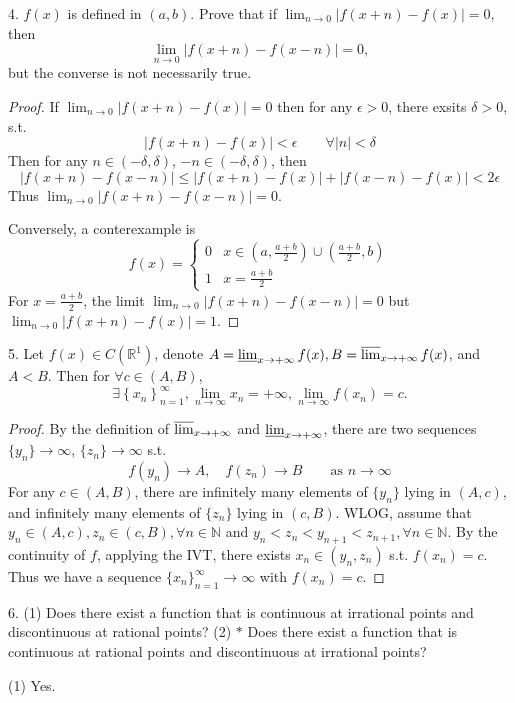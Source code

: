 \begin{exercise}
4. $f(x)$ is defined in $(a, b)$. Prove that if $\lim_{n \rightarrow 0}|f(x+n)-f(x)|=0$, then
\[
\lim_{n \rightarrow 0}|f(x+n)-f(x-n)|=0,
\]but the converse is not necessarily true.
\end{exercise}
\begin{proof}
If $\lim_{ n \to 0 }\lvert f(x+n)-f(x) \rvert=0$ then for any $\epsilon>0$, there exsits $\delta>0$, s.t.
\[
\lvert f(x+n)-f(x) \rvert <\epsilon \qquad \forall \lvert n \rvert <\delta
\]
Then for any $n\in(-\delta,\delta)$, $-n\in(-\delta,\delta)$, then
\[
\lvert f(x+n)-f(x-n) \rvert \leq \lvert f(x+n)-f(x) \rvert +\lvert f(x-n)-f(x) \rvert <2\epsilon
\]
Thus $\lim_{ n \to 0 }\lvert f(x+n)-f(x-n) \rvert=0$.

Conversely, a conterexample is
\[
f(x)=\begin{cases}
0 & x\in\left( a,\frac{a+b}{2} \right)\cup\left( \frac{a+b}{2},b \right) \\
1 & x=\frac{a+b}{2}
\end{cases}
\]
For $x=\frac{a+b}{2}$, the limit $\lim_{ n \to 0 }\lvert f(x+n)-f(x-n) \rvert=0$ but $\lim_{ n \to 0 }\lvert f(x+n)-f(x) \rvert=1$.
\end{proof}

\begin{exercise}
5. Let $f(x) \in C\left(\mathbb{R}^1\right)$, denote $A=\varliminf_{x \rightarrow+\infty} f(x), B=\varlimsup_{x \rightarrow+\infty} f(x)$, and $A<B$. Then for $\forall c \in(A, B)$,
\[
\exists\left\{x_n\right\}_{n=1}^{\infty}, \lim _{n \rightarrow \infty} x_n=+\infty, \lim _{n \rightarrow \infty} f\left(x_n\right)=c .
\]
\end{exercise}
\begin{proof}
By the definition of $\varlimsup_{ x \to +\infty }$ and $\varliminf_{ x \to +\infty }$, there are two sequences $\{ y_n \}\to \infty$, $\{ z_n \}\to \infty$ s.t.
\[
f(y_n)\to A,\quad f(z_n)\to B\qquad \text{as }n\to \infty
\]
For any $c\in(A,B)$, there are infinitely many elements of $\{ y_n \}$ lying in $(A,c)$, and infinitely many elements of $\{ z_n \}$ lying in $(c,B)$. WLOG, assume that $y_n\in (A, c), z_n\in (c, B),\forall n\in \mathbb{N}$ and $y_n<z_n<y_{n+1}<z_{n+1},\forall n\in \mathbb{N}$. By the continuity of $f$, applying the IVT, there exists $x_n\in(y_n,z_n)$ s.t. $f(x_n)=c$. Thus we have a sequence $\{ x_n \}_{n=1}^{\infty}\to \infty$ with $f(x_n)=c$.
\end{proof}

\begin{exercise}
6. (1) Does there exist a function that is continuous at irrational points and discontinuous at rational points?
(2) $\ast$ Does there exist a function that is continuous at rational points and discontinuous at irrational points?
\end{exercise}
(1) Yes.

